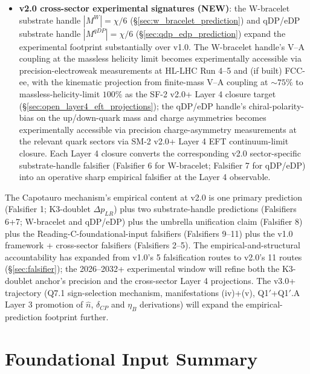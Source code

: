 \documentclass[11pt,letterpaper]{article}
\newcommand{\DeltapLR}{\Delta p_{LR}}
\begin{document}
\begin{itemize}
    \item \textbf{v2.0 cross-sector experimental signatures (NEW)}: the W-bracelet substrate handle $|M^W| = \chi/6$ (\S\ref{sec:w_bracelet_prediction}) and qDP/eDP substrate handle $|M^{qDP}| = \chi/6$ (\S\ref{sec:qdp_edp_prediction}) expand the experimental footprint substantially over v1.0. The W-bracelet handle's V--A coupling at the massless helicity limit becomes experimentally accessible via precision-electroweak measurements at HL-LHC Run 4--5 and (if built) FCC-ee, with the kinematic projection from finite-mass V--A coupling at $\sim 75\%$ to massless-helicity-limit $100\%$ as the SF-2 v2.0+ Layer 4 closure target (\S\ref{sec:open_layer4_eft_projections}); the qDP/eDP handle's chiral-polarity-bias on the up/down-quark mass and charge asymmetries becomes experimentally accessible via precision charge-asymmetry measurements at the relevant quark sectors via SM-2 v2.0+ Layer 4 EFT continuum-limit closure. Each Layer 4 closure converts the corresponding v2.0 sector-specific substrate-handle falsifier (Falsifier 6 for W-bracelet; Falsifier 7 for qDP/eDP) into an operative sharp empirical falsifier at the Layer 4 observable.
\end{itemize}

The Capotauro mechanism's empirical content at v2.0 is one primary prediction (Falsifier 1; K3-doublet $\DeltapLR$) plus two substrate-handle predictions (Falsifiers 6+7; W-bracelet and qDP/eDP) plus the umbrella unification claim (Falsifier 8) plus the Reading-C-foundational-input falsifiers (Falsifiers 9--11) plus the v1.0 framework + cross-sector falsifiers (Falsifiers 2--5). The empirical-and-structural accountability has expanded from v1.0's 5 falsification routes to v2.0's 11 routes (\S\ref{sec:falsifier}); the 2026--2032+ experimental window will refine both the K3-doublet anchor's precision and the cross-sector Layer 4 projections. The v3.0+ trajectory (Q7.1 sign-selection mechanism, manifestations (iv)+(v), Q1$'$+Q1$'$.A Layer 3 promotion of $\hat{n}$, $\delta_{CP}$ and $\eta_B$ derivations) will expand the empirical-prediction footprint further.

\section{Foundational Input Summary}\label{sec:fi_summary}
\end{document}
